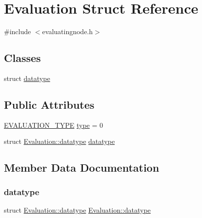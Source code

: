\hypertarget{structEvaluation}{}\section{Evaluation Struct Reference}
\label{structEvaluation}


{\ttfamily \#include $<$evaluatingnode.\+h$>$}

\subsection*{Classes}
\begin{DoxyCompactItemize}
\item 
struct \hyperlink{structEvaluation_1_1datatype}{datatype}
\end{DoxyCompactItemize}
\subsection*{Public Attributes}
\begin{DoxyCompactItemize}
\item 
\hyperlink{statics_8h_a6664c451ca7787483a7981cc1de68dbb}{E\+V\+A\+L\+U\+A\+T\+I\+O\+N\+\_\+\+T\+Y\+PE} \hyperlink{structEvaluation_ab056e930fde1d7f4ce8474e31f133860}{type} = 0
\item 
struct \hyperlink{structEvaluation_1_1datatype}{Evaluation\+::datatype} \hyperlink{structEvaluation_afd26f89d96c69704172ddcce5d08fee4}{datatype}
\end{DoxyCompactItemize}


\subsection{Member Data Documentation}
\mbox{\label{structEvaluation_afd26f89d96c69704172ddcce5d08fee4}} 
\subsubsection{\texorpdfstring{datatype}{datatype}}
{\footnotesize\ttfamily struct \hyperlink{structEvaluation_1_1datatype}{Evaluation\+::datatype}  \hyperlink{structEvaluation_1_1datatype}{Evaluation\+::datatype}}

\mbox{\label{structEvaluation_ab056e930fde1d7f4ce8474e31f133860}} 
